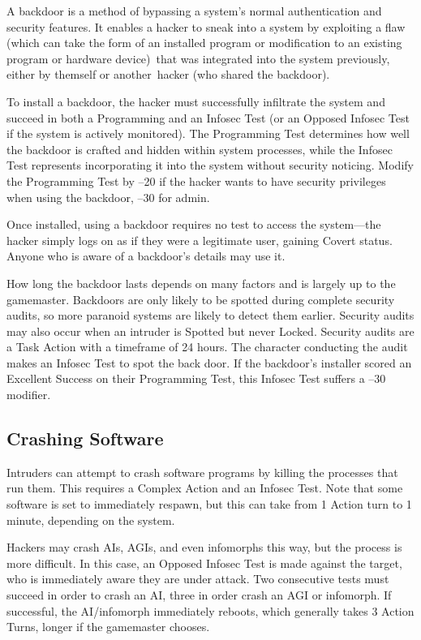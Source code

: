 A backdoor is a method of bypassing a system's normal 
authentication and security features. It enables a hacker 
to sneak into a system by exploiting a flaw (which can 
take the form of an installed program or modification 
to an existing program or hardware device) that was 
integrated into the system previously, either by themself 
or another hacker (who shared the backdoor).

To install a backdoor, the hacker must successfully 
infiltrate the system and succeed in both a Programming
and an Infosec Test (or an Opposed Infosec Test
if the system is actively monitored). The Programming 
Test determines how well the backdoor is crafted and 
hidden within system processes, while the Infosec Test 
represents incorporating it into the system without security
noticing. Modify the Programming Test by –20
if the hacker wants to have security privileges when 
using the backdoor, –30 for admin.

Once installed, using a backdoor requires no test to 
access the system—the hacker simply logs on as if they 
were a legitimate user, gaining Covert status. Anyone 
who is aware of a backdoor's details may use it.

How long the backdoor lasts depends on many factors
and is largely up to the gamemaster. Backdoors
are only likely to be spotted during complete security 
audits, so more paranoid systems are likely to detect 
them earlier. Security audits may also occur when an 
intruder is Spotted but never Locked. Security audits 
are a Task Action with a timeframe of 24 hours. The 
character conducting the audit makes an Infosec 
Test to spot the back door. If the backdoor's installer 
scored an Excellent Success on their Programming 
Test, this Infosec Test suffers a –30 modifier.

\subsection{Crashing Software}

Intruders can attempt to crash software programs 
by killing the processes that run them. This requires a 
Complex Action and an Infosec Test. Note that some 
software is set to immediately respawn, but this can take 
from 1 Action turn to 1 minute, depending on the system.

Hackers may crash AIs, AGIs, and even infomorphs 
this way, but the process is more difficult. In this case, 
an Opposed Infosec Test is made against the target, 
who is immediately aware they are under attack. Two 
consecutive tests must succeed in order to crash an AI, 
three in order crash an AGI or infomorph. If successful, 
the AI/infomorph immediately reboots, which generally 
takes 3 Action Turns, longer if the gamemaster chooses.


